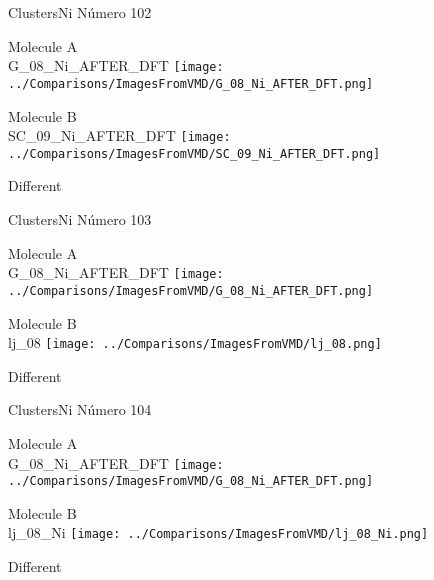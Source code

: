 \vtab[-3cm]
\begin{center}
{\large ClustersNi \tab Número 102}
\end{center}
\begin{multicols}{2}
\begin{center}
Molecule A \\ 
G\_08\_Ni\_AFTER\_DFT
\texttt{[image: ../Comparisons/ImagesFromVMD/G\_08\_Ni\_AFTER\_DFT.png]}
\\
\vtab

\columnbreak
Molecule B \\ 
SC\_09\_Ni\_AFTER\_DFT
\texttt{[image: ../Comparisons/ImagesFromVMD/SC\_09\_Ni\_AFTER\_DFT.png]}
\\
\vtab


\end{center}
\end{multicols}
\begin{center}
\textcolor{NavyBlue}{\Large Different}
\end{center}

 \newpage

\vtab[-3cm]
\begin{center}
{\large ClustersNi \tab Número 103}
\end{center}
\begin{multicols}{2}
\begin{center}
Molecule A \\ 
G\_08\_Ni\_AFTER\_DFT
\texttt{[image: ../Comparisons/ImagesFromVMD/G\_08\_Ni\_AFTER\_DFT.png]}
\\
\vtab

\columnbreak
Molecule B \\ 
lj\_08
\texttt{[image: ../Comparisons/ImagesFromVMD/lj\_08.png]}
\\
\vtab


\end{center}
\end{multicols}
\begin{center}
\textcolor{NavyBlue}{\Large Different}
\end{center}

 \newpage

\vtab[-3cm]
\begin{center}
{\large ClustersNi \tab Número 104}
\end{center}
\begin{multicols}{2}
\begin{center}
Molecule A \\ 
G\_08\_Ni\_AFTER\_DFT
\texttt{[image: ../Comparisons/ImagesFromVMD/G\_08\_Ni\_AFTER\_DFT.png]}
\\
\vtab

\columnbreak
Molecule B \\ 
lj\_08\_Ni
\texttt{[image: ../Comparisons/ImagesFromVMD/lj\_08\_Ni.png]}
\\
\vtab


\end{center}
\end{multicols}
\begin{center}
\textcolor{NavyBlue}{\Large Different}
\end{center}

